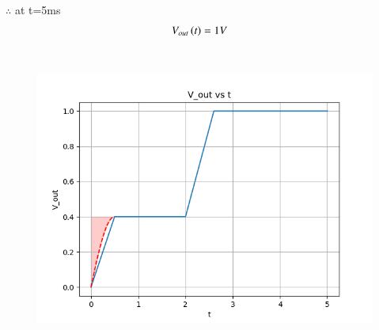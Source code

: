 \documentclass[journal,12pt,twocolumn]{IEEEtran}
\theoremstyle{remark}
\begin{document}
\\$\therefore$ at t=5ms
\begin{align}
V_{out}\left(t\right)&=1V
\end{align}
\\\begin{figure}[h]
\renewcommand\thefigure{1}
    \centering
    \includegraphics[width=1\linewidth]{figs/typo.png}
    \caption{ }
\end{figure}
\end{document}
